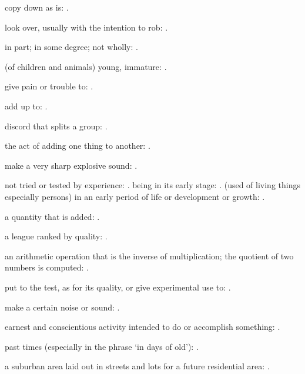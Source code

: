   copy down as is: .

  look over, usually with the intention to rob: .

  in part; in some degree; not wholly:   .

  (of children and animals) young, immature:   .

  give pain or trouble to: .

  add up to: .

  discord that splits a group:   .

  the act of adding one thing to another: .

  make a very sharp explosive sound: .

  not tried or tested by experience:   . being in its early stage: . (used of living things especially persons) in an early period of life or development or growth:   .

  a quantity that is added:   .

  a league ranked by quality:   .

  an arithmetic operation that is the inverse of multiplication; the quotient of two numbers is computed: .

  put to the test, as for its quality, or give experimental use to:   .

  make a certain noise or sound:   .

  earnest and conscientious activity intended to do or accomplish something:   .

  past times (especially in the phrase `in days of old'): .

  a suburban area laid out in streets and lots for a future residential area: .

